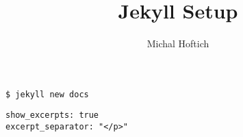 \documentclass{article}
\title{Jekyll Setup}
\author{Michal Hoftich}
\begin{document}
\maketitle

\begin{verbatim}
$ jekyll new docs
\end{verbatim}

\begin{verbatim}
show_excerpts: true
excerpt_separator: "</p>"
\end{verbatim}
\end{document}
